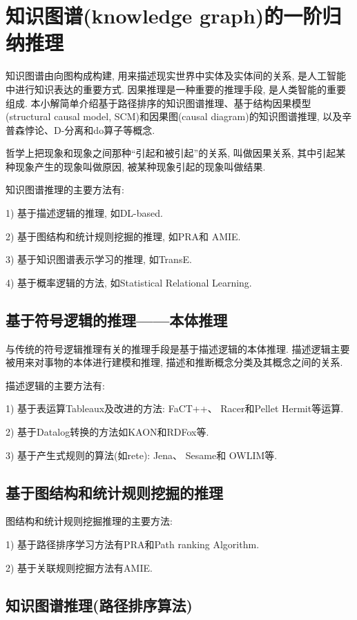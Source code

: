 \section{知识图谱(knowledge graph)的一阶归纳推理}
    知识图谱由向图构成构建, 用来描述现实世界中实体及实体间的关系, 是人工智能中进行知识表达的重要方式.
    因果推理是一种重要的推理手段, 是人类智能的重要组成.
    本小解简单介绍基于路径排序的知识图谱推理、基于结构因果模型(structural causal model, SCM)和因果图(causal diagram)的知识图谱推理, 以及辛普森悖论、D-分离和do算子等概念.
\begin{remark}
    哲学上把现象和现象之间那种“引起和被引起”的关系, 叫做因果关系, 其中引起某种现象产生的现象叫做原因, 被某种现象引起的现象叫做结果.
\end{remark}

知识图谱推理的主要方法有:

1) 基于描述逻辑的推理, 如DL-based.

2) 基于图结构和统计规则挖掘的推理, 如PRA和 AMIE.

3) 基于知识图谱表示学习的推理, 如TransE.

4) 基于概率逻辑的方法, 如Statistical Relational Learning.
\subsection{基于符号逻辑的推理——本体推理}
    与传统的符号逻辑推理有关的推理手段是基于描述逻辑的本体推理.
描述逻辑主要被用来对事物的本体进行建模和推理, 描述和推断概念分类及其概念之间的关系.

    描述逻辑的主要方法有:

1) 基于表运算Tableaux及改进的方法: FaCT++、 Racer和Pellet Hermit等运算.

2) 基于Datalog转换的方法如KAON和RDFox等.

3) 基于产生式规则的算法(如rete): Jena、 Sesame和 OWLIM等.

\subsection{基于图结构和统计规则挖掘的推理}

图结构和统计规则挖掘推理的主要方法:

1) 基于路径排序学习方法有PRA和Path ranking Algorithm.

2) 基于关联规则挖掘方法有AMIE.
\subsection{知识图谱推理(路径排序算法)}

